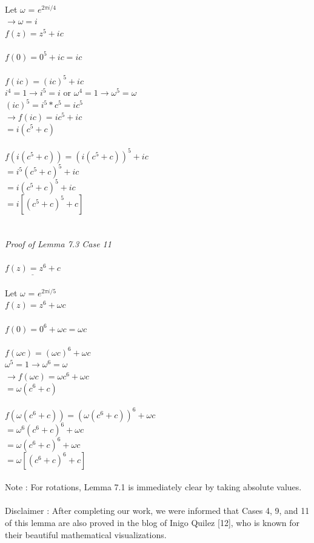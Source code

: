 \documentclass{article}
\begin{document}
\\
Let $\omega$ = $e^{2\pi i/4}$
\\$\rightarrow\omega = i$
\\$f(z) = z^5+ic$
\\
\\$f(0) = 0^5 + ic = ic$
\\
\\$f(ic) = (ic)^5 + ic$
\\$i^4 = 1 \rightarrow i^5 = i$ or $\omega^4 = 1 \rightarrow\omega^5=\omega$
\\$(ic)^5 = i^5*c^5 = ic^5$
\\$\rightarrow f(ic) = ic^5 + ic$
\\$= i(c^5+c)$
\\
\\$f(i(c^5+c)) = (i(c^5+c))^5 +  ic$
\\$= i^5(c^5+c)^5 +  ic$
\\$= i(c^5+c)^5 + ic$
\\$= i[(c^5+c)^5+c]$
\\
\\
\\
\textit{Proof of Lemma 7.3 Case 11}
\\
\\
$\underline{f(z) = z^6 + c}$          %
\\
\\
Let $\omega$ = $e^{2\pi i/5}$
\\$f(z) = z^6+\omega c$
\\
\\$f(0) = 0^6 + \omega c = \omega c$
\\
\\$f(\omega c) = (\omega c)^6 + \omega c$
\\$\omega^5 = 1 \rightarrow \omega^6 = \omega$
\\$\rightarrow f(\omega c) = \omega c^6 + \omega c$
\\$= \omega(c^6+c)$
\\
\\$f(\omega(c^6+c)) = (\omega(c^6+c))^6 + \omega c$
\\$= \omega^6(c^6+c)^6 + \omega c$
\\$= \omega(c^6+c)^6 + \omega c$
\\$= \omega[(c^6+c)^6+c]$
\\
\\Note : For rotations, Lemma 7.1 is immediately clear by taking absolute values.
\\
\\Disclaimer : After completing our work, we were informed that Cases 4, 9, and 11 of this lemma are also proved in the blog of Inigo Quilez [12], who is known for their beautiful mathematical visualizations.
\end{document}
